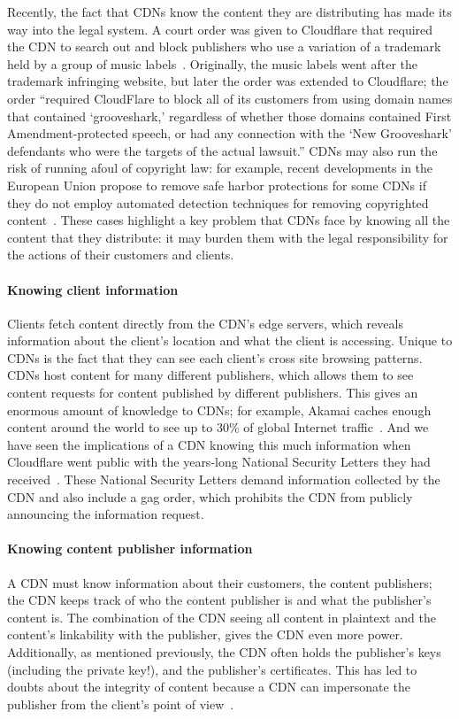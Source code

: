Recently, the fact that CDNs 
know the content they are distributing has made its way into the legal system.  A court order was given to Cloudflare 
that required the CDN to search out and block publishers who use a variation of a trademark held by a group of 
music labels~\cite{eff_cloudflare_trademark}.  Originally, the music labels went after the trademark infringing 
website, but later the order was extended to Cloudflare; the order ``required CloudFlare to block all of its customers 
from using domain names that contained `grooveshark,' regardless of whether those domains contained First 
Amendment-protected speech, or had any connection with the `New Grooveshark' defendants who were the 
targets of the actual lawsuit.'' CDNs may also run the risk of running afoul of
copyright law: for example, recent developments in the European Union propose to
remove safe harbor protections for some CDNs if they do not employ automated detection
techniques for removing copyrighted content~\cite{eu-copyright}.
These cases highlight a key problem that CDNs face by knowing all
the content
that they distribute: it may burden them with the legal responsibility for the actions of their customers 
and clients.

\paragraph{Knowing client information} Clients fetch content directly from the CDN's edge servers, which reveals 
information about the client's location and what the client is accessing.  Unique to CDNs is the fact that 
they can see each client's cross site browsing patterns.  CDNs host content for many different publishers, which allows 
them to see content requests for content published by different publishers.  This gives an enormous amount of 
knowledge to CDNs; for example, Akamai caches enough content around the world to see up to 30\% of global Internet 
traffic~\cite{akamai_global_traffic}.  And we have seen the implications of a CDN knowing this much information when Cloudflare 
went public with the years-long National Security Letters they had received~\cite{cloudflare_nsl}. These National Security Letters 
demand information collected by the CDN and also include a gag order, which prohibits the CDN from publicly announcing 
the information request.  

\paragraph{Knowing content publisher information} A CDN must know information
about their customers, the content
publishers; the CDN keeps track of who the content publisher is and 
what the publisher's content is.  The combination of the CDN seeing all content in plaintext and the content's 
linkability with the publisher, gives the CDN even more power.  Additionally, as mentioned previously, the CDN often 
holds the publisher's keys (including the private key!), and the publisher's certificates.  This has led to doubts 
about the integrity of content because a CDN can impersonate the publisher from the client's point of view~\cite{levy2015stickler}.

